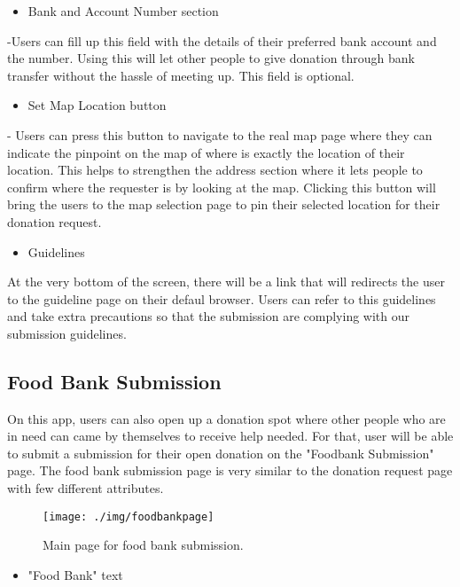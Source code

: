 \documentclass[conference]{IEEEtran}
\begin{document}
\begin{itemize}
\item Bank and Account Number section
\end{itemize}
-Users can fill up this field with the details of their preferred bank account and the number. Using this will let other people to give donation through bank transfer without the hassle of meeting up. This field is optional.\\ 


\begin{itemize}
\item Set Map Location button 
\end{itemize}
- Users can press this button to navigate to the real map page where they can indicate the pinpoint on the map of where is exactly the location of their location. This helps to strengthen the address section where it lets people to confirm where the requester is by looking at the map. Clicking this button will bring the users to the map selection page to pin their selected location for their donation request. \\

\begin{itemize}
\item Guidelines
\end{itemize}
At the very bottom of the screen, there will be a link that will redirects the user to the guideline page on their defaul browser. Users can refer to this guidelines and take extra precautions so that the submission are complying with our submission guidelines.

\subsection{Food Bank Submission}

On this app, users can also open up a donation spot where other people who are in need can came by themselves to receive help needed. For that, user will be able to submit a submission for their open donation on the "Foodbank Submission" page. The food bank submission page is very similar to the donation request page with few different attributes.

\begin{figure}[h!]
\texttt{[image: ./img/foodbankpage]}
\centering
\caption{Main page for food bank submission.}
\end{figure}


\begin{itemize}
\item "Food Bank" text
\end{itemize}
\end{document}

